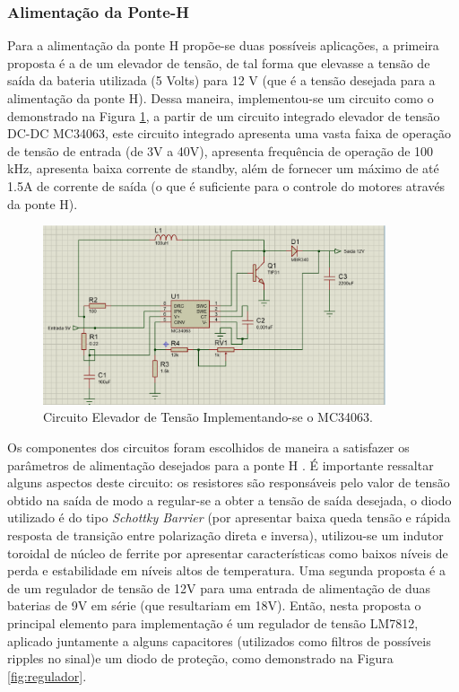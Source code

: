 \subsubsection{Alimentação da Ponte-H}

Para a alimentação da ponte H propõe-se duas possíveis aplicações, a primeira proposta é a de um elevador de tensão, de tal forma que
elevasse a tensão de saída da bateria utilizada (5 Volts) para 12 V (que é a tensão desejada para a alimentação da ponte H). Dessa maneira,
implementou-se um circuito como o demonstrado na Figura \ref{fig:elevador}, a partir de um circuito integrado elevador de tensão DC-DC MC34063, este
circuito integrado apresenta uma vasta faixa de operação de tensão de entrada (de 3V a 40V), apresenta frequência de operação de 100 kHz,
apresenta baixa corrente de standby, além de fornecer um máximo de até 1.5A de corrente de saída (o que é suficiente para o controle
do motores através da ponte H)\cite{kuhl:2013}.

\begin{figure}[H]
    \centering
    \includegraphics[width=0.9\textwidth]{figuras/elevador.eps}
    \caption{Circuito Elevador de Tensão Implementando-se o MC34063.}
    \label{fig:elevador}
\end{figure}

Os componentes dos circuitos foram escolhidos de maneira a satisfazer os parâmetros de alimentação desejados para a ponte H
 \cite{kuhl:2013}. É importante ressaltar alguns aspectos deste circuito: os resistores são responsáveis pelo valor
de tensão obtido na saída de modo a regular-se  a obter a tensão de saída desejada, o diodo utilizado é do tipo \textit{Schottky Barrier} (por
apresentar baixa queda tensão e rápida resposta de transição entre polarização direta e inversa), utilizou-se um indutor toroidal de
núcleo de ferrite por apresentar características como baixos níveis de perda e estabilidade em níveis altos de temperatura.
Uma segunda proposta é a de um regulador de tensão de 12V para uma entrada de alimentação de duas baterias de 9V em série (que resultariam
em 18V). Então, nesta proposta o principal elemento para implementação é um regulador de tensão LM7812, aplicado juntamente a alguns
capacitores (utilizados como filtros de possíveis ripples no sinal)e um diodo de proteção, como demonstrado na Figura \ref{fig:regulador}.

